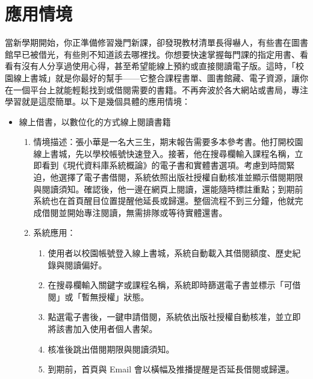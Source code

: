\chapter{應用情境}

\hspace{2em}當新學期開始，你正準備修習幾門新課，卻發現教材清單長得嚇人，有些書在圖書館早已被借光，有些則不知道該去哪裡找。你想要快速掌握每門課的指定用書、看看有沒有人分享過使用心得，甚至希望能線上預約或直接閱讀電子版。這時，「校園線上書城」就是你最好的幫手——它整合課程書單、圖書館藏、電子資源，讓你在一個平台上就能輕鬆找到或借閱需要的書籍。不再奔波於各大網站或書局，專注學習就是這麼簡單。以下是幾個具體的應用情境：

\begin{itemize}
    \item 線上借書，以數位化的方式線上閱讀書籍
        \begin{enumerate}
            \item 情境描述：張小華是一名大三生，期末報告需要多本參考書。他打開校園線上書城，先以學校帳號快速登入。接著，他在搜尋欄輸入課程名稱，立即看到《現代資料庫系統概論》的電子書和實體書選項。考慮到時間緊迫，他選擇了電子書借閱，系統依照出版社授權自動核准並顯示借閱期限與閱讀須知。確認後，他一邊在網頁上閱讀，還能隨時標註重點；到期前系統也在首頁醒目位置提醒他延長或歸還。整個流程不到三分鐘，他就完成借閱並開始專注閱讀，無需排隊或等待實體還書。
            \item 系統應用：
                \begin{enumerate}
                    \item 使用者以校園帳號登入線上書城，系統自動載入其借閱額度、歷史紀錄與閱讀偏好。
                    \item 在搜尋欄輸入關鍵字或課程名稱，系統即時篩選電子書並標示「可借閱」或「暫無授權」狀態。
                    \item 點選電子書後，一鍵申請借閱，系統依出版社授權自動核准，並立即將該書加入使用者個人書架。
                    \item 核准後跳出借閱期限與閱讀須知。
                    \item 到期前，首頁與 Email 會以橫幅及推播提醒是否延長借閱或歸還。
                \end{enumerate}
        \end{enumerate}
        

\end{itemize}
